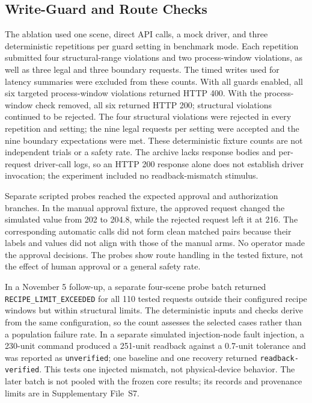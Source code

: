 \subsection{Write-Guard and Route Checks}
\label{sec:eval-ablation}
The ablation used one scene, direct API calls, a mock driver, and three deterministic repetitions per guard setting in benchmark mode. Each repetition submitted four structural-range violations and two process-window violations, as well as three legal and three boundary requests. The timed writes used for latency summaries were excluded from these counts. With all guards enabled, all six targeted process-window violations returned HTTP 400. With the process-window check removed, all six returned HTTP 200; structural violations continued to be rejected. The four structural violations were rejected in every repetition and setting; the nine legal requests per setting were accepted and the nine boundary expectations were met. These deterministic fixture counts are not independent trials or a safety rate. The archive lacks response bodies and per-request driver-call logs, so an HTTP 200 response alone does not establish driver invocation; the experiment included no readback-mismatch stimulus.

Separate scripted probes reached the expected approval and authorization branches. In the manual approval fixture, the approved request changed the simulated value from 202 to 204.8, while the rejected request left it at 216. The corresponding automatic calls did not form clean matched pairs because their labels and values did not align with those of the manual arms. No operator made the approval decisions. The probes show route handling in the tested fixture, not the effect of human approval or a general safety rate.

In a November 5 follow-up, a separate four-scene probe batch returned \texttt{RECIPE\_LIMIT\_EXCEEDED} for all 110 tested requests outside their configured recipe windows but within structural limits. The deterministic inputs and checks derive from the same configuration, so the count assesses the selected cases rather than a population failure rate. In a separate simulated injection-node fault injection, a 230-unit command produced a 251-unit readback against a 0.7-unit tolerance and was reported as \texttt{unverified}; one baseline and one recovery returned \texttt{readback-verified}. This tests one injected mismatch, not physical-device behavior. The later batch is not pooled with the frozen core results; its records and provenance limits are in Supplementary File~S7.

